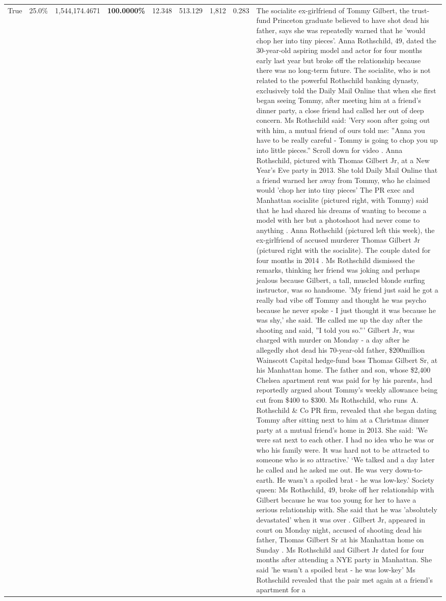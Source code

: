 \begin{table}[H]
\begin{tabular}{lllrlllll}
True & 25.0\% & 1,544,174.4671 & \bfseries \color{red} 100.0000\% & 12.348 & 513.129 & 1,812 & 0.283 & The socialite ex-girlfriend of Tommy Gilbert, the trust-fund Princeton graduate believed to have shot dead his father, says she was repeatedly warned that he 'would chop her into tiny pieces'. Anna Rothschild, 49, dated the 30-year-old aspiring model and actor for four months early last year but broke off the relationship because there was no long-term future. The socialite, who is not related to the powerful Rothschild banking dynasty, exclusively told the Daily Mail Online that when she first began seeing Tommy, after meeting him at a friend's dinner party, a close friend had called her out of deep concern. Ms Rothschild said: 'Very soon after going out with him, a mutual friend of ours told me: ''Anna you have to be really careful - Tommy is going to chop you up into little pieces.'' Scroll down for video . Anna Rothschild, pictured with Thomas Gilbert Jr, at a New Year's Eve party in 2013. She told Daily Mail Online that a friend warned her away from Tommy, who he claimed would 'chop her into tiny pieces' The PR exec and Manhattan socialite (pictured right, with Tommy) said that he had shared his dreams of wanting to become a model with her but a photoshoot had never come to anything . Anna Rothschild (pictured left this week), the ex-girlfriend of accused murderer Thomas Gilbert Jr (pictured right with the socialite). The couple dated for four months in 2014 . Ms Rothschild dismissed the remarks, thinking her friend was joking and perhaps jealous because Gilbert, a tall, muscled blonde surfing instructor, was so handsome. 'My friend just said he got a really bad vibe off Tommy and thought he was psycho because he never spoke - I just thought it was because he was shy,' she said. 'He called me up the day after the shooting and said, ''I told you so.''' Gilbert Jr, was charged with murder on Monday - a day after he allegedly shot dead his 70-year-old father, \$200million Wainscott Capital hedge-fund boss Thomas Gilbert Sr, at his Manhattan home. The father and son, whose \$2,400 Chelsea apartment rent was paid for by his parents, had reportedly argued about Tommy's weekly allowance being cut from \$400 to \$300. Ms Rothschild, who runs A. Rothschild \& Co PR firm, revealed that she began dating Tommy after sitting next to him at a Christmas dinner party at a mutual friend's home in 2013. She said: 'We were sat next to each other. I had no idea who he was or who his family were. It was hard not to be attracted to someone who is so attractive.' ‘We talked and a day later he called and he asked me out. He was very down-to-earth. He wasn’t a spoiled brat - he was low-key.’ Society queen: Ms Rothschild, 49, broke off her relationship with Gilbert because he was too young for her to have a serious relationship with. She said that he was 'absolutely devastated' when it was over . Gilbert Jr, appeared in court on Monday night, accused of shooting dead his father, Thomas Gilbert Sr at his Manhattan home on Sunday . Ms Rothschild and Gilbert Jr dated for four months after attending a NYE party in Manhattan. She said 'he wasn't a spoiled brat - he was low-key' Ms Rothschild revealed that the pair met again at a friend’s apartment for a 
\end{tabular}
\end{table}
